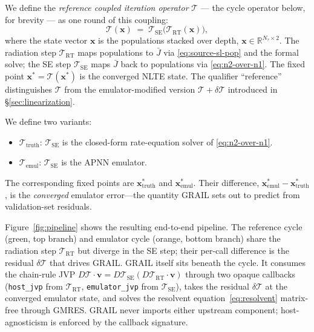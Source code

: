 \documentclass[11pt]{article}
\newcommand{\Tcyc}{\mathcal{T}}
\newcommand{\Trt}{\Tcyc_{\mathrm{RT}}}
\newcommand{\Tse}{\Tcyc_{\mathrm{SE}}}
\newcommand{\dT}{\delta\Tcyc}
\newcommand{\Jbar}{\bar{J}}
\newcommand{\code}[1]{\texttt{#1}}
\begin{document}
We define the \emph{reference coupled iteration operator} $\Tcyc$ ---
the cycle operator below, for brevity --- as one round of this
coupling:
\begin{equation}
\Tcyc(\mathbf{x}) \;=\; \Tse\bigl(\Trt(\mathbf{x})\bigr),
\label{eq:cycle}
\end{equation}
where the state vector $\mathbf{x}$ is the populations stacked over depth,
$\mathbf{x} \in \mathbb{R}^{N_\tau \times 2}$. The radiation step $\Trt$
maps populations to $\Jbar$ via \eqref{eq:source-sl-pop} and the formal
solve; the SE step $\Tse$ maps $\Jbar$ back to populations via
\eqref{eq:n2-over-n1}. The fixed point $\mathbf{x}^* = \Tcyc(\mathbf{x}^*)$ is
the converged NLTE state.  The qualifier ``reference'' distinguishes
$\Tcyc$ from the emulator-modified version $\Tcyc + \dT$ introduced
in \S\ref{sec:linearization}.

We define two variants:
\begin{itemize}
\item $\Tcyc_{\text{truth}}$: $\Tse$ is the closed-form rate-equation solver
of \eqref{eq:n2-over-n1}.
\item $\Tcyc_{\text{emul}}$: $\Tse$ is the APNN emulator.
\end{itemize}
The corresponding fixed points are $\mathbf{x}^*_{\text{truth}}$ and
$\mathbf{x}^*_{\text{emul}}$.  Their difference,
$\mathbf{x}^*_{\text{emul}} - \mathbf{x}^*_{\text{truth}}$, is the
\emph{converged} emulator error---the quantity GRAIL sets out to
predict from validation-set residuals.

Figure~\ref{fig:pipeline} shows the resulting end-to-end pipeline.
The reference cycle (green, top branch) and emulator cycle (orange, bottom
branch) share the radiation step $\Trt$ but diverge in the SE step;
their per-call difference is the residual $\dT$ that drives GRAIL.
GRAIL itself sits beneath the cycle.  It consumes the chain-rule JVP
$D\Tcyc\cdot\mathbf{v} = D\Tse(D\Trt\cdot\mathbf{v})$ through two
opaque callbacks (\code{host\_jvp} from $\Trt$, \code{emulator\_jvp}
from $\Tse$), takes the residual $\dT$ at the converged emulator
state, and solves the resolvent equation~\eqref{eq:resolvent}
matrix-free through GMRES.  GRAIL never imports either upstream
component; host-agnosticism is enforced by the callback signature.
\end{document}
